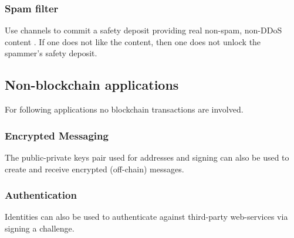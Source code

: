 \documentclass[a4paper, 10pt, conference]{ieeeconf}      %
\begin{document}
\begin{sketch}
\begin{draft}
\end{draft}

\ifdraft      
\subsubsection{Spam filter}
Use channels to commit a safety deposit providing real non-spam, non-DDoS content \cite{ethereumpredictions}. If one does not like the content, then one does not unlock the spammer's safety deposit. 
   
      
\subsection{Non-blockchain applications}
For following applications no blockchain transactions are involved.
\subsubsection{Encrypted Messaging}
The public-private keys pair used for addresses and signing can also be used to create and receive encrypted (off-chain) messages. 
\subsubsection{Authentication}
Identities can also be used to authenticate against third-party web-services via signing a challenge.
\fi

\end{sketch}
\end{document}
